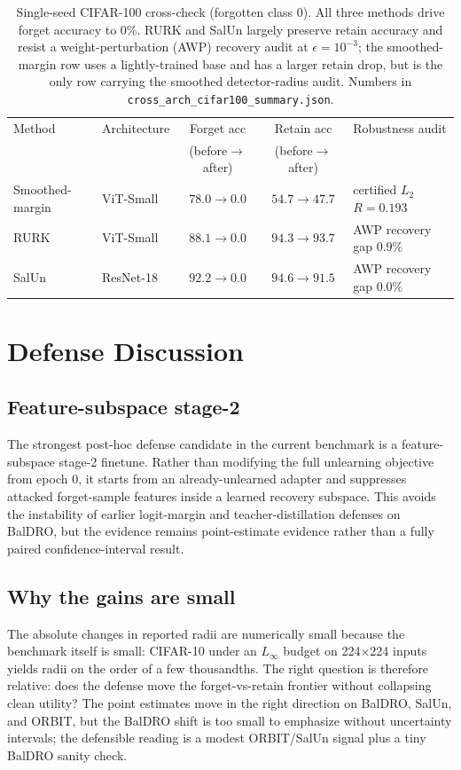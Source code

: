 \documentclass[11pt]{article}
\begin{document}
\begin{table}[t]
  \centering
  \small
  \begin{tabular}{l l c c l}
    \toprule
    Method & Architecture & Forget acc & Retain acc & Robustness audit \\
     & & (before$\to$after) & (before$\to$after) & \\
    \midrule
    Smoothed-margin & ViT-Small & $78.0\to0.0$ & $54.7\to47.7$ & certified $L_2$ $R=0.193$ \\
    RURK            & ViT-Small & $88.1\to0.0$ & $94.3\to93.7$ & AWP recovery gap $0.9\%$ \\
    SalUn           & ResNet-18 & $92.2\to0.0$ & $94.6\to91.5$ & AWP recovery gap $0.0\%$ \\
    \bottomrule
  \end{tabular}
  \caption{Single-seed CIFAR-100 cross-check (forgotten class 0). All three methods drive forget accuracy to $0\%$. RURK and SalUn largely preserve retain accuracy and resist a weight-perturbation (AWP) recovery audit at $\epsilon=10^{-3}$; the smoothed-margin row uses a lightly-trained base and has a larger retain drop, but is the only row carrying the smoothed detector-radius audit. Numbers in \texttt{cross\_arch\_cifar100\_summary.json}.}
  \label{tab:crossarch}
\end{table}

\section{Defense Discussion}
\subsection{Feature-subspace stage-2}
The strongest post-hoc defense candidate in the current benchmark is a feature-subspace stage-2 finetune. Rather than modifying the full unlearning objective from epoch 0, it starts from an already-unlearned adapter and suppresses attacked forget-sample features inside a learned recovery subspace. This avoids the instability of earlier logit-margin and teacher-distillation defenses on BalDRO, but the evidence remains point-estimate evidence rather than a fully paired confidence-interval result.

\subsection{Why the gains are small}
The absolute changes in reported radii are numerically small because the benchmark itself is small: CIFAR-10 under an $L_\infty$ budget on 224$\times$224 inputs yields radii on the order of a few thousandths. The right question is therefore relative: does the defense move the forget-vs-retain frontier without collapsing clean utility? The point estimates move in the right direction on BalDRO, SalUn, and ORBIT, but the BalDRO shift is too small to emphasize without uncertainty intervals; the defensible reading is a modest ORBIT/SalUn signal plus a tiny BalDRO sanity check.
\end{document}
